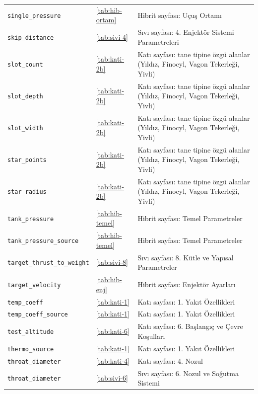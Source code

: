 \documentclass[11pt,a4paper]{article}
\begin{document}
{\begin{longtable}{@{}>{\raggedright\arraybackslash}p{5.2cm}p{1.4cm}>{\raggedright\arraybackslash}p{7.4cm}@{}}
\texttt{single\_\allowbreak{}pressure} & \ref{tab:hib-ortam} & Hibrit sayfası: Uçuş Ortamı \\
\texttt{skip\_\allowbreak{}distance} & \ref{tab:sivi-4} & Sıvı sayfası: 4. Enjektör Sistemi Parametreleri \\
\texttt{slot\_\allowbreak{}count} & \ref{tab:kati-2b} & Katı sayfası: tane tipine özgü alanlar (Yıldız, Finocyl, Vagon Tekerleği, Yivli) \\
\texttt{slot\_\allowbreak{}depth} & \ref{tab:kati-2b} & Katı sayfası: tane tipine özgü alanlar (Yıldız, Finocyl, Vagon Tekerleği, Yivli) \\
\texttt{slot\_\allowbreak{}width} & \ref{tab:kati-2b} & Katı sayfası: tane tipine özgü alanlar (Yıldız, Finocyl, Vagon Tekerleği, Yivli) \\
\texttt{star\_\allowbreak{}points} & \ref{tab:kati-2b} & Katı sayfası: tane tipine özgü alanlar (Yıldız, Finocyl, Vagon Tekerleği, Yivli) \\
\texttt{star\_\allowbreak{}radius} & \ref{tab:kati-2b} & Katı sayfası: tane tipine özgü alanlar (Yıldız, Finocyl, Vagon Tekerleği, Yivli) \\
\texttt{tank\_\allowbreak{}pressure} & \ref{tab:hib-temel} & Hibrit sayfası: Temel Parametreler \\
\texttt{tank\_\allowbreak{}pressure\_\allowbreak{}source} & \ref{tab:hib-temel} & Hibrit sayfası: Temel Parametreler \\
\texttt{target\_\allowbreak{}thrust\_\allowbreak{}to\_\allowbreak{}weight} & \ref{tab:sivi-8} & Sıvı sayfası: 8. Kütle ve Yapısal Parametreler \\
\texttt{target\_\allowbreak{}velocity} & \ref{tab:hib-enj} & Hibrit sayfası: Enjektör Ayarları \\
\texttt{temp\_\allowbreak{}coeff} & \ref{tab:kati-1} & Katı sayfası: 1. Yakıt Özellikleri \\
\texttt{temp\_\allowbreak{}coeff\_\allowbreak{}source} & \ref{tab:kati-1} & Katı sayfası: 1. Yakıt Özellikleri \\
\texttt{test\_\allowbreak{}altitude} & \ref{tab:kati-6} & Katı sayfası: 6. Başlangıç ve Çevre Koşulları \\
\texttt{thermo\_\allowbreak{}source} & \ref{tab:kati-1} & Katı sayfası: 1. Yakıt Özellikleri \\
\texttt{throat\_\allowbreak{}diameter} & \ref{tab:kati-4} & Katı sayfası: 4. Nozul \\
\texttt{throat\_\allowbreak{}diameter} & \ref{tab:sivi-6} & Sıvı sayfası: 6. Nozul ve Soğutma Sistemi \\

\end{longtable}}
\end{document}
